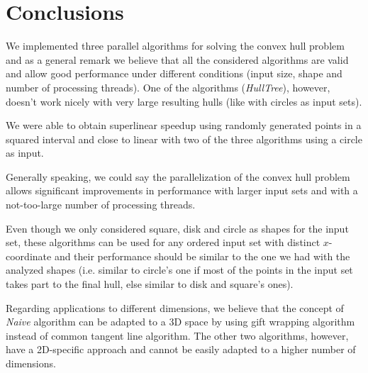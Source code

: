 \documentclass[letterpaper]{article}
\theoremstyle{definition}
\begin{document}
\section{Conclusions}

We implemented three parallel algorithms for solving the convex hull problem and as a general remark we believe that all the considered algorithms are valid and allow good performance under different conditions (input size, shape and number of processing threads).
One of the algorithms (\textit{HullTree}), however, doesn't work nicely with very large resulting hulls (like with circles as input sets).

We were able to obtain superlinear speedup using randomly generated points in a squared interval %
and close to linear with two of the three algorithms using a circle as input.

Generally speaking, we could say the parallelization of the convex hull problem allows significant improvements in performance with larger input sets and with a not-too-large number of processing threads.

Even though we only considered square, disk and circle as shapes for the input set, these algorithms can be used for any ordered input set with distinct $x$-coordinate and their performance should be similar to the one we had with the analyzed shapes (i.e. similar to circle's one if most of the points in the input set takes part to the final hull, else similar to disk and square's ones).

Regarding applications to different dimensions, we believe that the concept of \textit{Naive} algorithm can be adapted to a 3D space by using gift wrapping algorithm instead of common tangent line algorithm.
The other two algorithms, however, have a 2D-specific approach and cannot be easily adapted to a higher number of dimensions.



\end{document}
